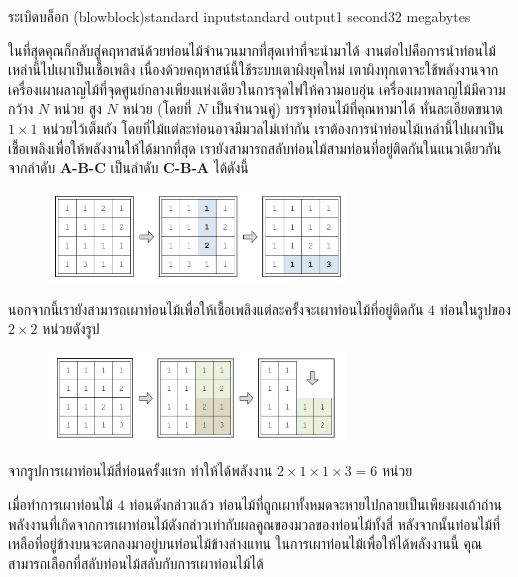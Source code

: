 \documentclass[11pt,a4paper]{article}
\begin{document}
\begin{problem}{ระเบิดบล็อก (blowblock)}{standard input}{standard output}{1 second}{32 megabytes}

 ในที่สุดคุณก็กลับสู่คฤหาสน์ด้วยท่อนไม้จำนวนมากที่สุดเท่าที่จะนำมาได้ งานต่อไปคือการนำท่อนไม้เหล่านี้ไปเผาเป็นเชื้อเพลิง เนื่องด้วยคฤหาสน์นี้ใช้ระบบเตาผิงยุคใหม่ เตาผิงทุกเตาจะใช้พลังงานจากเครื่องเผาผลาญไม้ที่จุดศูนย์กลางเพียงแห่งเดียวในการจุดไฟให้ความอบอุ่น
 เครื่องเผาพลาญไม้มีความกว้าง $N$ หน่วย สูง $N$ หน่วย (โดยที่ $N$ เป็นจำนวนคู่) บรรจุท่อนไม้ที่คุณหามาได้ หั่นละเอียดขนาด $1\times 1$ หน่วยไว้เต็มถัง โดยที่ไม้แต่ละท่อนอาจมีมวลไม่เท่ากัน  เราต้องการนำท่อนไม้เหล่านี้ไปเผาเป็นเชื้อเพลิงเพื่อให้พลังงานให้ได้มากที่สุด เรายังสามารถสลับท่อนไม้สามท่อนที่อยู่ติดกันในแนวเดียวกัน จากลำดับ \textbf{A-B-C} เป็นลำดับ \textbf{C-B-A} ได้ดังนี้

\begin{figure}[h!]
\centering
\includegraphics[width=0.7\textwidth]{../latex/img/1081/pic1.jpg}
\end{figure}

 นอกจากนี้เรายังสามารถเผาท่อนไม้เพื่อให้เชื้อเพลิงแต่ละครั้งจะเผาท่อนไม้ที่อยู่ติดกัน $4$ ท่อนในรูปของ $2\times 2$ หน่วยดังรูป
 
 \begin{figure}[h!]
\centering
\includegraphics[width=0.7\textwidth]{../latex/img/1081/pic2.jpg}
\end{figure}
 
 จากรูปการเผาท่อนไม้สี่ท่อนครั้งแรก ทำให้ได้พลังงาน $2\times 1\times 1\times 3=6$ หน่วย
 
 เมื่อทำการเผาท่อนไม้ $4$ ท่อนดังกล่าวแล้ว ท่อนไม้ที่ถูกเผาทั้งหมดจะหายไปกลายเป็นเพียงผงเถ้าถ่าน พลังงานที่เกิดจากการเผาท่อนไม้ดังกล่าวเท่ากับผลคูณของมวลของท่อนไม้ทั้งสี่  หลังจากนั้นท่อนไม้ที่เหลือที่อยู่ข้างบนจะตกลงมาอยู่บนท่อนไม้ข้างล่างแทน  ในการเผาท่อนไม้เพื่อให้ได้พลังงานนี้ คุณสามารถเลือกที่สลับท่อนไม้สลับกับการเผาท่อนไม้ได้
 

\end{problem}
\end{document}
